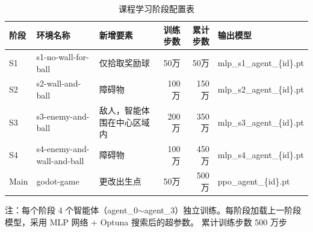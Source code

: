 \documentclass[12pt, a4paper, UTF8]{ctexart}
\numberwithin{equation}{section}
\begin{document}
\begin{table}[htbp]
  \centering
  \caption{ 课程学习阶段配置表}
  \label{tab:appendix_curriculum}
  \setlength{\tabcolsep}{3.5pt}
  \begin{tabular}{l >{\raggedright\arraybackslash}p{3.2cm} >{\raggedright\arraybackslash}p{3.5cm} r r >{\raggedright\arraybackslash}p{2.8cm}}
    \toprule
    阶段 & 环境名称 & 新增要素 & 训练步数 & 累计步数 & 输出模型 \\
    \midrule
    S1 & s1-no-wall-for-ball        & 仅拾取奖励球       & 50万   & 50万   & mlp\_s1\_agent\_\{id\}.pt \\
    S2 & s2-wall-and-ball          & 障碍物      & 100万  & 150万  & mlp\_s2\_agent\_\{id\}.pt \\
    S3 & s3-enemy-and-ball            & 敌人，智能体围在中心区域内        & 200万  & 350万  & mlp\_s3\_agent\_\{id\}.pt \\
    S4 & s4-enemy-and-wall-and-ball & 障碍物      & 100万  & 450万  & mlp\_s4\_agent\_\{id\}.pt \\
    Main & godot-game              & 更改出生点  & 50万   & 500万  & ppo\_agent\_\{id\}.pt \\
    \bottomrule
  \end{tabular}
  \vspace{6pt}

  {注：每个阶段 4 个智能体（agent\_0$\sim$agent\_3）独立训练。每阶段加载上一阶段模型，采用 MLP 网络 + Optuna 搜索后的超参数。
  累计训练步数 500 万步}
\end{table}
\end{document}
